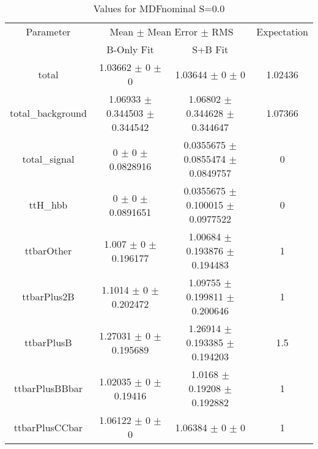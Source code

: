 \begin{table}
\centering
\caption{Values for MDFnominal S=0.0}
\begin{tabular}{cccc}
\toprule
Parameter & \multicolumn{2}{c}{Mean $\pm$ Mean Error $\pm$ RMS} & Expectation\\
 & B-Only Fit & S+B Fit & \\
\midrule
total & \num{1.03662} $\pm$ \num{0} $\pm$ \num{0} & \num{1.03644} $\pm$ \num{0} $\pm$ \num{0} & \num{1.02436}\\
total\_background & \num{1.06933} $\pm$ \num{0.344503} $\pm$ \num{0.344542} & \num{1.06802} $\pm$ \num{0.344628} $\pm$ \num{0.344647} & \num{1.07366}\\
total\_signal & \num{0} $\pm$ \num{0} $\pm$ \num{0.0828916} & \num{0.0355675} $\pm$ \num{0.0855474} $\pm$ \num{0.0849757} & \num{0}\\
ttH\_hbb & \num{0} $\pm$ \num{0} $\pm$ \num{0.0891651} & \num{0.0355675} $\pm$ \num{0.100015} $\pm$ \num{0.0977522} & \num{0}\\
ttbarOther & \num{1.007} $\pm$ \num{0} $\pm$ \num{0.196177} & \num{1.00684} $\pm$ \num{0.193876} $\pm$ \num{0.194483} & \num{1}\\
ttbarPlus2B & \num{1.1014} $\pm$ \num{0} $\pm$ \num{0.202472} & \num{1.09755} $\pm$ \num{0.199811} $\pm$ \num{0.200646} & \num{1}\\
ttbarPlusB & \num{1.27031} $\pm$ \num{0} $\pm$ \num{0.195689} & \num{1.26914} $\pm$ \num{0.193385} $\pm$ \num{0.194203} & \num{1.5}\\
ttbarPlusBBbar & \num{1.02035} $\pm$ \num{0} $\pm$ \num{0.19416} & \num{1.0168} $\pm$ \num{0.19208} $\pm$ \num{0.192882} & \num{1}\\
ttbarPlusCCbar & \num{1.06122} $\pm$ \num{0} $\pm$ \num{0} & \num{1.06384} $\pm$ \num{0} $\pm$ \num{0} & \num{1}\\
\bottomrule
\end{tabular}
\end{table}